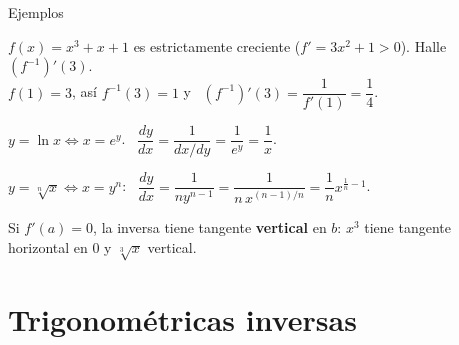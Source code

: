 \documentclass[10pt,aspectratio=169]{beamer}
\begin{document}
\begin{frame}{Ejemplos}
  \begin{ejemplo}
    $f(x)=x^3+x+1$ es estrictamente creciente ($f'=3x^2+1>0$). Halle $\left(f^{-1}\right)'(3)$.\\
    $f(1)=3$, así $f^{-1}(3)=1$ y \ $\left(f^{-1}\right)'(3)=\dfrac{1}{f'(1)}=\dfrac14$.
  \end{ejemplo}
  \begin{ejemplo}[2: logaritmo]
    $y=\ln x\iff x=e^y$. \ $\dfrac{dy}{dx}=\dfrac{1}{dx/dy}=\dfrac1{e^y}=\dfrac1x$.
  \end{ejemplo}
  \begin{ejemplo}
    $y=\sqrt[n]x\iff x=y^n$: \ $\dfrac{dy}{dx}=\dfrac1{ny^{n-1}}=\dfrac{1}{n\,x^{(n-1)/n}}=\dfrac1nx^{\frac1n-1}$. \checkmark
  \end{ejemplo}
  \begin{observacion}
    Si $f'(a)=0$, la inversa tiene tangente \textbf{vertical} en $b$: $x^3$ tiene tangente horizontal en $0$ y $\sqrt[3]x$ vertical.
  \end{observacion}
\end{frame}

\section{Trigonométricas inversas}
\end{document}
